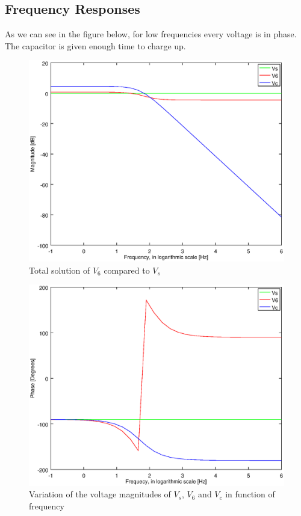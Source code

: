 \subsection{Frequency Responses}

As we can see in the figure below, for low frequencies every voltage is in phase. The capacitor is given enough time to charge up.

\begin{figure}[h] \centering
\includegraphics[width=0.5\linewidth]{magnitude.eps}
	\caption{Total solution of $V_6$ compared to $V_s$}
        \label{fig:mag}
\end{figure}


\begin{figure}[h] \centering
\includegraphics[width=0.7\linewidth]{phase.eps}
	\caption{Variation of the voltage magnitudes of $V_s$, $V_6$ and $V_c$ in function of frequency}
        \label{fig:phase}
\end{figure}




